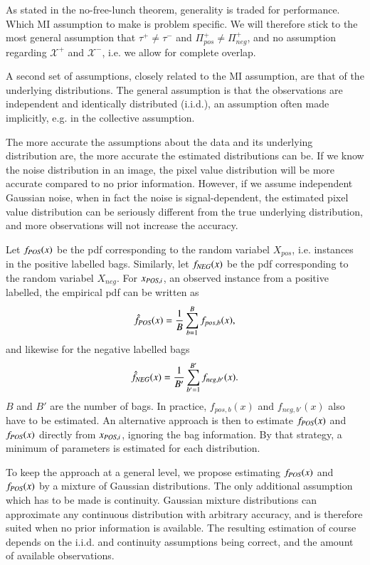 As stated in the no-free-lunch theorem, generality is traded for performance. 
Which MI assumption to make is problem specific. 
We will therefore stick to the most general assumption that $\tau^+ \neq \tau^-$ and $\Pi^+_{pos} \neq \Pi^+_{neg}$, and no assumption regarding $\mathcal{X^+}$ and $\mathcal{X^-}$, i.e. we allow for complete overlap.

A second set of assumptions, closely related to the MI assumption, are that of the underlying distributions. 
The general assumption is that the observations are independent and identically distributed (i.i.d.), an assumption often made implicitly, e.g. in the collective assumption. 

The more accurate the assumptions about the data and its underlying distribution are, the more accurate the estimated distributions can be. 
If we know the noise distribution in an image, the pixel value distribution will be more accurate compared to no prior information. 
However, if we assume independent Gaussian noise, when in fact the noise is signal-dependent, the estimated pixel value distribution can be seriously different from the true underlying distribution, and more observations will not increase the accuracy. 


Let $f_{\text{\scriptsize{{\it POS}}}}(x)$ be the pdf corresponding to the random variabel $X_{pos}$, i.e. instances in the positive labelled bags. Similarly, let $f_{\text{\scriptsize{{\it NEG}}}}(x)$ be the pdf corresponding to the random variabel $X_{neg}$. 
For $x_{\text{\scriptsize{{\it POS}}},i}$, an observed instance from a positive labelled, the empirical pdf can be written as
\begin{align}
  \hat{f}_{\text{\scriptsize{{\it POS}}}}(x) = \frac{1}{B}\sum_{b = 1}^B  f_{pos,b}(x), 
\end{align}
and likewise for the negative labelled bags
\begin{align}
  \hat{f}_{\text{\scriptsize{{\it NEG}}}}(x) = \frac{1}{B'}\sum_{b' = 1}^{B'}  f_{neg,{b'}}(x). 
\end{align}
$B$ and $B'$ are the number of bags. 
In practice, $f_{pos,b}(x)$ and $f_{neg,{b'}}(x)$ also have to be estimated. 
An alternative approach is then to estimate $f_{\text{\scriptsize{{\it POS}}}}(x)$ and  $f_{\text{\scriptsize{{\it POS}}}}(x)$ directly from $x_{\text{\scriptsize{{\it POS}}},i}$, ignoring the bag information. 
By that strategy, a minimum of parameters is estimated for each distribution. 

To keep the approach at a general level, we propose estimating $f_{\text{\scriptsize{{\it POS}}}}(x)$ and $f_{\text{\scriptsize{{\it POS}}}}(x)$ by a mixture of Gaussian distributions. 
The only additional assumption which has to be made is continuity. 
Gaussian mixture distributions can approximate any continuous distribution with arbitrary accuracy, and is therefore suited when no prior information is available. 
The resulting estimation of course depends on the i.i.d. and continuity assumptions being correct, and the amount of available observations. 

